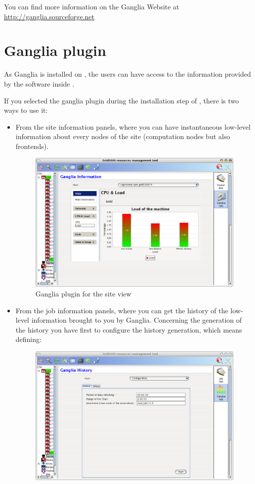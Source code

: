 You can find more information on the Ganglia Website at
\url{http://ganglia.sourceforge.net} 

\section{Ganglia plugin}

As Ganglia is installed on \gfk, the \grudu users can have access to the
information provided by the software inside \grudu.

If you selected the ganglia plugin during the installation step of \grudu, there
is two ways to use it:
\begin{itemize}
  \item From the site information panels, where you can have instantaneous
  low-level information about every nodes of the site (computation nodes but also
  frontends).
  \begin{figure}[H]
  \centering 
  \includegraphics[width=0.5\linewidth]{figures/GRUDU_interface3_ganglia.eps}
	\caption{Ganglia plugin for the site view}
	\label{fig:GRUDU_view_site_ganglia}
  \end{figure}
  \item From the job information panels, where you can get the history of the
  low-level information brought to you by Ganglia. Concerning the generation of
  the history you have first to configure the history generation, which means defining:
  \begin{figure}[H]
  \centering
  \includegraphics[width=0.5\linewidth]{figures/GRUDU_interface4_ganglia_prerequisites.eps}

\end{figure}
\end{itemize}
